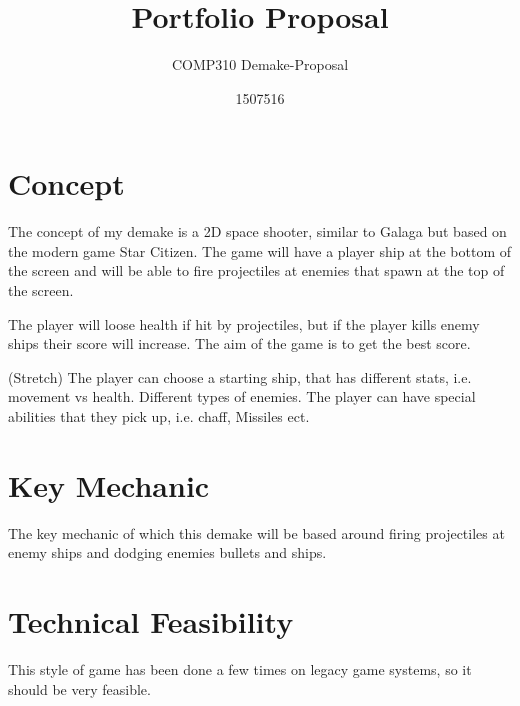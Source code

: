 \documentclass{scrartcl}
\title{Portfolio Proposal}
\subtitle{COMP310 Demake-Proposal}
\author{1507516}
\begin{document}
\maketitle

\abstract{}

\section{Concept}
The concept of my demake is a 2D space shooter, similar to Galaga but based on the modern game Star Citizen.
The game will have a player ship at the bottom of the screen and will be able to fire projectiles at enemies that spawn at the top of the screen.

The player will loose health if hit by projectiles, but if the player kills enemy ships their score will increase.
The aim of the game is to get the best score.

(Stretch)
The player can choose a starting ship, that has different stats, i.e. movement vs health.
Different types of enemies.
The player can have special abilities that they pick up, i.e. chaff, Missiles ect.



\section{Key Mechanic}
The key mechanic of which this demake will be based around firing projectiles at enemy ships and dodging enemies bullets and ships.


\section{Technical Feasibility}
This style of game has been done a few times on legacy game systems, so it should be very feasible.
\end{document}
